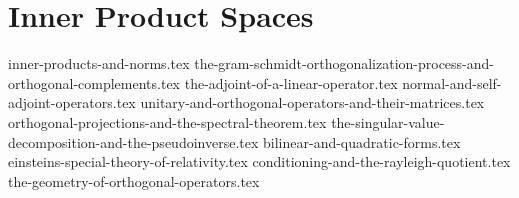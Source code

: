 \chapter{Inner Product Spaces}
{inner-products-and-norms.tex}
{the-gram-schmidt-orthogonalization-process-and-orthogonal-complements.tex}
{the-adjoint-of-a-linear-operator.tex}
{normal-and-self-adjoint-operators.tex}
{unitary-and-orthogonal-operators-and-their-matrices.tex}
{orthogonal-projections-and-the-spectral-theorem.tex}
{the-singular-value-decomposition-and-the-pseudoinverse.tex}
{bilinear-and-quadratic-forms.tex}
{einsteins-special-theory-of-relativity.tex}
{conditioning-and-the-rayleigh-quotient.tex}
{the-geometry-of-orthogonal-operators.tex}
